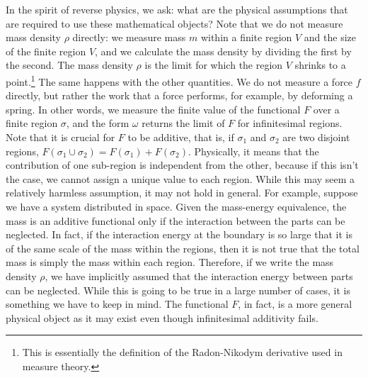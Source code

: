 
In the spirit of reverse physics, we ask: what are the physical assumptions that are required to use these mathematical objects? Note that we do not measure mass density $\rho$ directly: we measure mass $m$ within a finite region $V$ and the size of the finite region $V$, and we calculate the mass density by dividing the first by the second. The mass density $\rho$  is the limit for which the region $V$ shrinks to a point.\footnote{This is essentially the definition of the Radon-Nikodym derivative used in measure theory.} The same happens with the other quantities. We do not measure a force $f$ directly, but rather the work that a force performs, for example, by deforming a spring. In other words, we measure the finite value of the functional $F$ over a finite region $\sigma$, and the form $\omega$ returns the limit of $F$ for infinitesimal regions. Note that it is crucial for $F$ to be additive, that is, if $\sigma_1$ and $\sigma_2$ are two disjoint regions, $F(\sigma_1 \cup \sigma_2) = F(\sigma_1) + F(\sigma_2)$. Physically, it means that the contribution of one sub-region is independent from the other, because if this isn't the case, we cannot assign a unique value to each region. While this may seem a relatively harmless assumption, it may not hold in general. For example, suppose we have a system distributed in space. Given the mass-energy equivalence, the mass is an additive functional only if the interaction between the parts can be neglected. In fact, if the interaction energy at the boundary is so large that it is of the same scale of the mass within the regions, then it is not true that the total mass is simply the mass within each region. Therefore, if we write the mass density $\rho$, we have implicitly assumed that the interaction energy between parts can be neglected. While this is going to be true in a large number of cases, it is something we have to keep in mind. The functional $F$, in fact, is a more general physical object as it may exist even though infinitesimal additivity fails.

